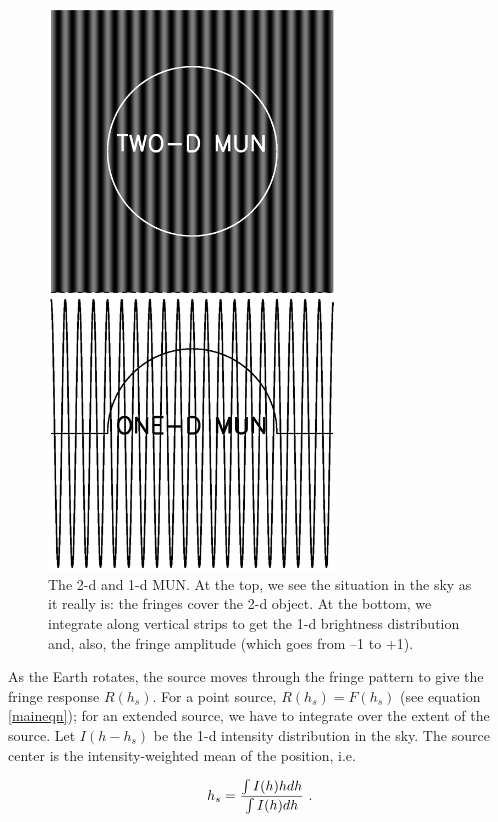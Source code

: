 \documentclass[11pt,preprint]{aastex}
\begin{document}
\begin{figure}[h!]
\begin{center}
\includegraphics[width=3.0in] {interf_fig.ps}
\end{center}
                                                                                
\caption{The 2-d and 1-d MUN. At the top, we see the situation in the
sky as it really is: the fringes cover the 2-d object.
At the bottom, we integrate along vertical strips to get the 1-d
brightness distribution and, also, the fringe amplitude (which goes from
--1 to +1). 
\label{interf_fig} } \end{figure}

As the Earth rotates, the source moves through the fringe pattern to
give the fringe response $R(h_s)$. For a point source, $R(h_s)= F(h_s)$
(see equation \ref{maineqn}); for an extended source, we have to
integrate over the extent of the source.  Let $I(h - h_s)$ be the 1-d
intensity distribution in the sky. 
The source center is the intensity-weighted mean of the
position, i.e.

\begin{equation}
h_s = { \int I(h)h dh \over \int I(h) dh} \ .
\end{equation}
\end{document}
